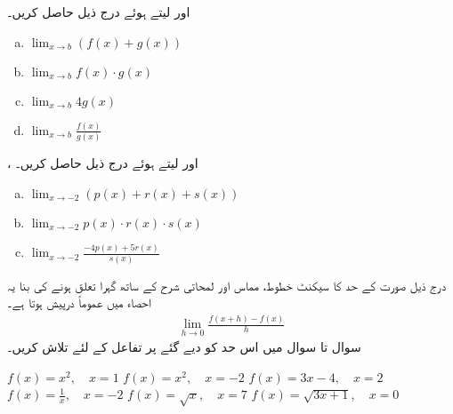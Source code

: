  اور  لیتے ہوئے درج ذیل حاصل کریں۔
\begin{multicols}{2}
\begin{enumerate}[a.]
\item
$\lim_{x\to b} (f(x)+g(x))$
\item
$\lim_{x\to b} f(x)\cdot g(x)$
\item
$\lim_{x\to b} 4g(x)$
\item
$\lim_{x\to b} \tfrac{f(x)}{g(x)}$
\end{enumerate}
\end{multicols}

،  اور  لیتے ہوئے درج ذیل حاصل کریں۔
\begin{multicols}{2}
\begin{enumerate}[a.]
\item
$\lim_{x\to -2} (p(x)+r(x)+s(x))$
\item
$\lim_{x\to -2} p(x)\cdot r(x)\cdot s(x)$
\item
$\lim_{x\to -2} \tfrac{-4p(x)+5r(x)}{s(x)}$
\end{enumerate}
\end{multicols}

درج ذیل صورت کے حد کا سیکنٹ خطوط، مماس اور لمحاتی شرح کے ساتھ گہرا تعلق ہونے کی بنا یہ احصاء میں عموماً درپیش ہوتا ہے۔
\begin{align*}
\lim_{h\to 0}\frac{f(x+h)-f(x)}{h}
\end{align*}
سوال  تا سوال  میں اس حد کو دیے گئے  پر تفاعل  کے لئے تلاش کریں۔

$f(x)=x^2,\quad x=1$
$f(x)=x^2,\quad x=-2$
$f(x)=3x-4,\quad x=2$
$f(x)=\tfrac{1}{x},\quad x=-2$
$f(x)=\sqrt{x},\quad x=7$
$f(x)=\sqrt{3x+1},\quad x=0$


